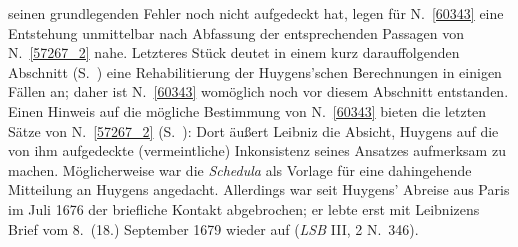 \begin{ledgroup}
%
seinen grundlegenden Fehler noch nicht aufgedeckt hat,
%
legen für N.~\ref{60343} 
%
eine Entstehung unmittelbar nach Abfassung der entsprechenden Passagen von N.~\ref{57267_2} nahe. 
%
Letzteres Stück deutet in einem kurz darauffolgenden Abschnitt (S.~) 
%
eine Rehabilitierung der \protect{}Huygens'schen 
%
Berechnungen in einigen Fällen an; daher ist N.~\ref{60343} womöglich noch vor diesem Abschnitt entstanden.
\pend
%
\pstart
Einen Hinweis auf die mögliche Bestimmung von N.~\ref{60343} bieten die letzten Sätze von N.~\ref{57267_2} (S.~):
%
Dort äußert Leibniz die Absicht, \protect{}Huygens 
%
auf die von ihm aufgedeckte (vermeintliche) Inkonsistenz seines Ansatzes aufmerksam zu machen.
%
Möglicherweise war die \textit{Schedula} als Vorlage für eine dahingehende Mitteilung an Huygens angedacht.
%
Allerdings war seit Huygens' Abreise aus Paris im Juli 1676 der briefliche Kontakt abgebrochen; er lebte erst mit Leibnizens Brief vom 8.\ (18.) September 1679 wieder auf (\cite{02046}\textit{LSB} III, 2 N.~346).
%
\pend
\end{ledgroup}